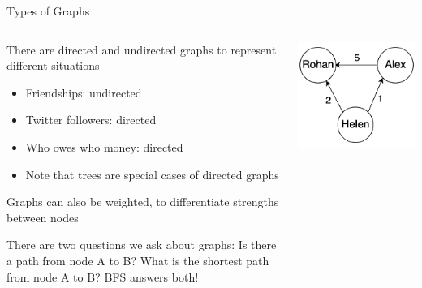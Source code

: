 \documentclass[
  ignorenonframetext,
]{beamer}
\begin{document}
\begin{frame}{Types of Graphs}
\protect\hypertarget{types-of-graphs}{}
\begin{columns}[T]
\begin{column}{0.6\textwidth}
There are directed and undirected graphs to represent different
situations

\begin{itemize}
\item
  Friendships: undirected
\item
  Twitter followers: directed
\item
  Who owes who money: directed
\item
  Note that trees are special cases of directed graphs
\end{itemize}

Graphs can also be weighted, to differentiate strengths between nodes

There are two questions we ask about graphs: Is there a path from node A
to B? What is the shortest path from node A to B? BFS answers both!
\end{column}

\begin{column}{0.4\textwidth}
\includegraphics{images/graph-weight.png}
\end{column}
\end{columns}
\end{frame}
\end{document}
